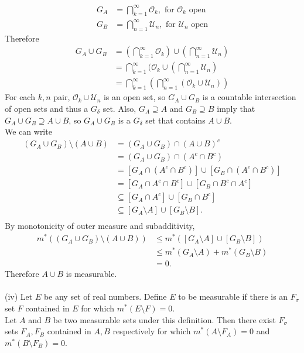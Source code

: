 \begin{enumerate}
	\begin{align*}
		G_A &= \bigcap_{k=1}^\infty \mathcal{O}_k,\text{ for }\mathcal{O}_k\text{ open}\\
		G_B &= \bigcap_{n=1}^\infty \mathcal{U}_n,\text{ for }\mathcal{U}_n\text{ open}
	\end{align*}
	Therefore 
	\begin{align*}
		G_A\cup G_B&=(\bigcap_{k=1}^\infty \mathcal{O}_k)\cup(\bigcap_{n=1}^\infty \mathcal{U}_n)\\
		&=\bigcap_{k=1}^\infty (\mathcal{O}_k\cup(\bigcap_{n=1}^\infty \mathcal{U}_n)\\
		&=\bigcap_{k=1}^\infty (\bigcap_{n=1}^\infty(\mathcal{O}_k\cup \mathcal{U}_n))
	\end{align*}
	For each $k,n$ pair, $\mathcal{O}_k\cup \mathcal{U}_n$ is an open set, so $G_A\cup G_B$ is a countable intersection of open sets and thus a $G_\delta$ set.
	Also, $G_A\supseteq A$ and $G_B\supseteq B$ imply that $G_A\cup G_B\supseteq A\cup B$, so $G_A\cup G_B$ is a $G_\delta$ set that contains $A\cup B$.\\
	We can write
	\begin{align*}
		(G_A\cup G_B)\setminus(A\cup B)&=(G_A\cup G_B)\cap(A\cup B)^c\\
		&=(G_A\cup G_B)\cap(A^c\cap B^c)\\
		&=[G_A\cap(A^c\cap B^c)]\cup[G_B\cap(A^c\cap B^c)]\\
		&=[G_A\cap A^c\cap B^c]\cup[G_B\cap B^c\cap A^c]\\
		&\subseteq[G_A\cap A^c]\cup[G_B\cap B^c]\\
		&\subseteq[G_A\setminus A]\cup[G_B\setminus B].\\
	\end{align*}
	By monotonicity of outer measure and subadditivity, 
	\begin{align*}
		m^*((G_A\cup G_B)\setminus(A\cup B))&\le m^*([G_A\setminus A]\cup[G_B\setminus B])\\
		&\le m^*(G_A\setminus A)+m^*(G_B\setminus B)\\
		&=0.
	\end{align*}
	Therefore $A\cup B$ is measurable.\\
	\\(iv) Let $E$ be any set of real numbers. Define $E$ to be measurable if there is an $F_\sigma$ set $F$ contained in $E$ for which $m^*(E\setminus F)=0$.\\
	Let $A$ and $B$ be two measurable sets under this definition.
	Then there exist $F_\sigma$ sets $F_A,F_B$ contained in $A,B$ respectively for which $m^*(A\setminus F_A)=0$ and $m^*(B\setminus F_B)=0$.\\

\end{enumerate}
